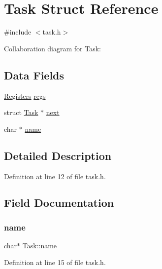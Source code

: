 \hypertarget{a00142}{}\section{Task Struct Reference}
\label{a00142}


{\ttfamily \#include $<$task.\+h$>$}



Collaboration diagram for Task\+:
\subsection*{Data Fields}
\begin{DoxyCompactItemize}
\item 
\hyperlink{a00138}{Registers} \hyperlink{a00142_a136b243ee52ff89e9ba97f4e4dba19bb_a136b243ee52ff89e9ba97f4e4dba19bb}{regs}
\item 
struct \hyperlink{a00142}{Task} $\ast$ \hyperlink{a00142_a8b6b50960a19f7bae344ef0cc8ec4e7d_a8b6b50960a19f7bae344ef0cc8ec4e7d}{next}
\item 
char $\ast$ \hyperlink{a00142_a9cf84d1792cda878178fd3691e472b97_a9cf84d1792cda878178fd3691e472b97}{name}
\end{DoxyCompactItemize}


\subsection{Detailed Description}


Definition at line 12 of file task.\+h.



\subsection{Field Documentation}
\mbox{\label{a00142_a9cf84d1792cda878178fd3691e472b97_a9cf84d1792cda878178fd3691e472b97}} 
\subsubsection{\texorpdfstring{name}{name}}
{\footnotesize\ttfamily char$\ast$ Task\+::name}



Definition at line 15 of file task.\+h.

\mbox{\label{a00142_a8b6b50960a19f7bae344ef0cc8ec4e7d_a8b6b50960a19f7bae344ef0cc8ec4e7d}} 
